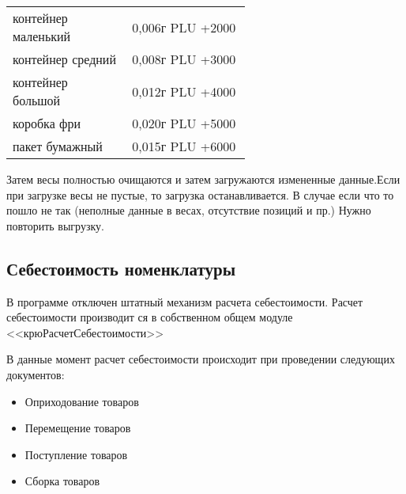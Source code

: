 

\vspace{\baselineskip}
\begin{tabular}{p{0.3\linewidth}p{0.3\linewidth}}
	\toprule   
	контейнер маленький & 0,006г PLU +2000 \\
	контейнер средний & 0,008г PLU +3000 \\
	контейнер большой & 0,012г PLU +4000 \\
	коробка фри  & 0,020г PLU +5000 \\
	пакет бумажный  & 0,015г PLU +6000 \\
	\bottomrule %
\end{tabular}
\vspace{\baselineskip}


 Затем весы полностью очищаются и затем загружаются измененные данные.Если при загрузке весы не пустые, то загрузка останавливается.
 В случае если что то пошло не так (неполные данные в весах, отсутствие позиций и пр.) Нужно повторить выгрузку.
 
 
\subsection{Себестоимость номенклатуры}\label{1002}	 

В программе отключен штатный механизм расчета себестоимости. Расчет себестоимости производит ся в собственном общем модуле <<крюРасчетСебестоимости>>

В данные момент расчет себестоимости происходит при проведении следующих документов:  
\begin{itemize}
	\item Оприходование товаров
	\item Перемещение товаров
	\item Поступление товаров
	\item Сборка товаров
	
\end{itemize}

